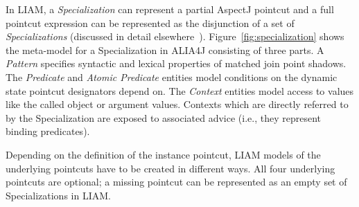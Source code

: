 In LIAM, a \emph{Specialization} can represent a partial AspectJ pointcut and a full pointcut expression can be represented as the disjunction of a set of \emph{Specializations} (discussed in detail elsewhere~\cite{Bockisch2007}).
Figure~\ref{fig:specialization} shows the meta-model for a Specialization in ALIA4J consisting of three parts.
A \emph{Pattern} specifies syntactic and lexical properties of matched join point shadows.
The \emph{Predicate} and \emph{Atomic Predicate} entities model conditions on the dynamic state pointcut designators depend on.
The \emph{Context} entities model access to values like the called object or argument values.
Contexts which are directly referred to by the Specialization are exposed to associated advice (i.e., they represent binding predicates).

Depending on the definition of the instance pointcut, LIAM models of the underlying pointcuts have to be created in different ways.
All four underlying pointcuts are optional; a missing pointcut can be represented as an empty set of Specializations in LIAM.

